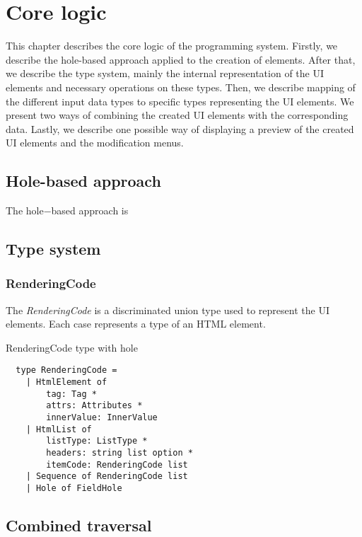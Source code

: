 \chapter{Core logic}
\label{chap:corelogic}

This chapter describes the core logic of the programming system.
Firstly, we describe the hole-based approach applied to the creation of elements.
After that, we describe the type system, mainly the internal representation of the UI elements and necessary operations on these types.
Then, we describe mapping of the different input data types to specific types representing the UI elements.
We present two ways of combining the created UI elements with the corresponding data.
Lastly, we describe one possible way of displaying a preview of the created UI elements and the modification menus.

\section{Hole-based approach}
The hole−based approach is

\section{Type system}
\subsection{RenderingCode}
The \emph{RenderingCode} is a discriminated union type used to represent the UI elements.
Each case represents a type of an HTML element.


\begin{listing}[H]
	\label{list:holeCode}
	\caption {RenderingCode type with hole}
	\begin{lstlisting}
  type RenderingCode =
    | HtmlElement of 
        tag: Tag * 
        attrs: Attributes * 
        innerValue: InnerValue
    | HtmlList of 
        listType: ListType * 
        headers: string list option * 
        itemCode: RenderingCode list
    | Sequence of RenderingCode list
    | Hole of FieldHole
  \end{lstlisting}
\end{listing}

\section{Combined traversal}

